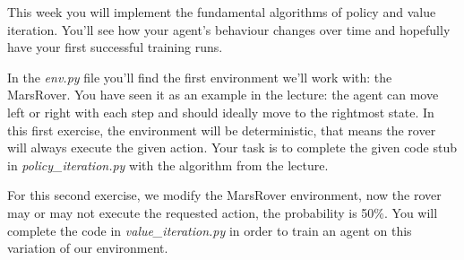 \documentclass{exam}
\begin{document}
\noindent
This week you will implement the fundamental algorithms of policy and value iteration. You'll see how your agent's behaviour changes over time and hopefully have your first successful training runs.

\begin{questions}
	In the \emph{env.py} file you'll find the first environment we'll work with: the MarsRover. You have seen it as an example in the lecture: the agent can move left or right with each step and should ideally move to the rightmost state.
	In this first exercise, the environment will be deterministic, that means the rover will always execute the given action.
	Your task is to complete the given code stub in \emph{policy\_iteration.py} with the algorithm from the lecture.
	
	For this second exercise, we modify the MarsRover environment, now the rover may or may not execute the requested action, the probability is 50\%. You will complete the code in \emph{value\_iteration.py} in order to train an agent on this variation of our environment.
\end{questions}
\end{document}
